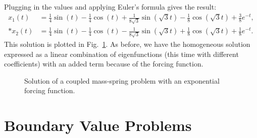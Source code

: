 Plugging in the values and applying Euler's formula gives the result:
\begin{subequations}
\begin{align}
  x_1(t) &= \frac{1}{4} \sin( t ) - \frac{1}{4} \cos( t ) + \frac{ 1 }{ 8 \sqrt{3} } \sin( \sqrt{3} t ) - \frac{1}{8} \cos( \sqrt{3} t ) + \frac{3}{8} e^{-t} , \\*
  x_2(t) &= \frac{1}{4} \sin( t ) - \frac{1}{4} \cos( t ) - \frac{ 1 }{ 8 \sqrt{3} } \sin( \sqrt{3} t ) + \frac{1}{8} \cos( \sqrt{3} t ) + \frac{1}{8} e^{-t} .
\end{align}
\end{subequations}
This solution is plotted in Fig.~\ref{Fig:ode_CoupledSpringProblem_ExponentialForcing}. As before, we have the homogeneous solution expressed as a linear combination of eigenfunctions (this time with different coefficients) with an added term because of the forcing function.

\begin{figure}[htp!]
\begin{center}
\caption{Solution of a coupled mass-spring problem with an exponential forcing function.}
\label{Fig:ode_CoupledSpringProblem_ExponentialForcing}
\end{center}
\end{figure}

\section{Boundary Value Problems}

